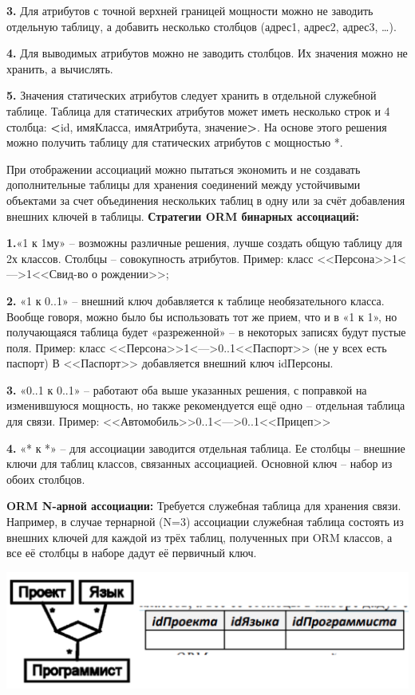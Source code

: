 \textbf{3.} Для атрибутов с точной верхней границей мощности можно не заводить отдельную таблицу, а добавить несколько столбцов (адрес1, адрес2, адрес3, …). 

\textbf{4.} Для выводимых атрибутов можно не заводить столбцов. Их значения можно не хранить, а вычислять. 

\textbf{5.} Значения статических атрибутов следует хранить в отдельной служебной таблице. Таблица для статических атрибутов может иметь несколько строк и 4 столбца: \textbf{<}id, имяКласса, имяАтрибута, значение\textbf{>}. На основе этого решения можно получить таблицу для статических атрибутов с мощностью *.

При отображении ассоциаций можно пытаться экономить и не создавать дополнительные таблицы для хранения соединений между устойчивыми объектами за счет объединения нескольких таблиц в одну или за счёт добавления внешних ключей в таблицы. \textbf{Стратегии ORM бинарных ассоциаций:} 

\textbf{1.}«1 к 1му» – возможны различные решения, лучше создать общую таблицу для 2х классов. Столбцы – совокупность атрибутов. Пример: класс <<Персона>>1<--->1<<Свид-во о рождении>>; 

\textbf{2.} «1 к 0..1» – внешний ключ добавляется к таблице необязательного класса. Вообще говоря, можно было бы использовать тот же прием, что и в «1 к 1», но получающаяся таблица будет «разреженной» – в некоторых записях будут пустые поля. Пример: класс <<Персона>>1<--->0..1<<Паспорт>> (не у всех есть паспорт) В <<Паспорт>> добавляется внешний ключ idПерсоны. 

\textbf{3.} «0..1 к 0..1» – работают оба выше указанных решения, с поправкой на изменившуюся мощность, но также рекомендуется ещё одно – отдельная таблица для связи. Пример: <<Автомобиль>>0..1<--->0..1<<Прицеп>> 

\textbf{4.} «* к *» – для ассоциации заводится отдельная таблица. Ее столбцы – внешние ключи для таблиц классов, связанных ассоциацией. Основной ключ – набор из обоих столбцов.

\textbf{ORM N-арной ассоциации:} Требуется служебная таблица для хранения связи. Например, в случае тернарной (N=3) ассоциации служебная таблица состоять из внешних ключей для каждой из трёх таблиц, полученных при ORM классов, а все её столбцы в наборе дадут её первичный ключ.

\includegraphics[scale=0.05]{pics/4_1.png}

